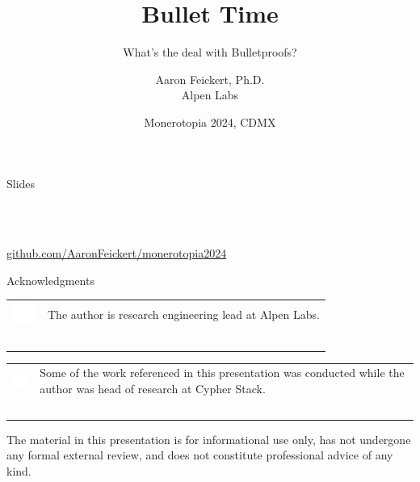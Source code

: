 \documentclass[aspectratio=169]{beamer}
\title{Bullet Time}
\subtitle{What's the deal with Bulletproofs?}
\author{Aaron Feickert, Ph.D.\texorpdfstring{\\ Alpen Labs}{}}
\date{Monerotopia 2024, CDMX}
\begin{document}
\frame{\titlepage}


\begin{frame}{Slides}
    \begin{center}
         \\~\\
    \end{center}

    \begin{center}
        \url{github.com/AaronFeickert/monerotopia2024}
    \end{center}
\end{frame}


\begin{frame}{Acknowledgments}
    \begin{tabular}{>{\arraybackslash}m{40px} >{\arraybackslash}m{320px}}
        \includegraphics[width=30px]{images/alpen.png} & The author is research engineering lead at Alpen Labs. \\~\\
    \end{tabular}

    \begin{tabular}{>{\arraybackslash}m{40px} >{\arraybackslash}m{320px}}
        \includegraphics[width=30px]{images/cs.png} & Some of the work referenced in this presentation was conducted while the author was head of research at Cypher Stack. \\~\\
    \end{tabular}

    The material in this presentation is for informational use only, has not undergone any formal external review, and does not constitute professional advice of any kind.
\end{frame}
\end{document}
